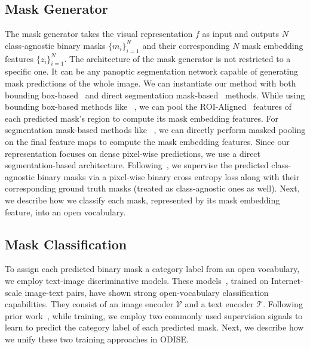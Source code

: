 \documentclass[10pt,twocolumn,letterpaper]{article}
\newcommand{\ourmethod}{ODISE}
\begin{document}
\subsection{Mask Generator}
\label{sec:mask-generator}
The mask generator takes the visual representation $f$ as input and outputs $N$ class-agnostic binary masks $\{m_i\}_{i=1}^N$ and their corresponding $N$ mask embedding features $\{z_i\}_{i=1}^N$.
The architecture of the mask generator is not restricted to a specific one. 
It can be any panoptic segmentation network capable of generating mask predictions of the whole image. 
We can instantiate our method with both bounding box-based~\cite{carion2020detr, kirillov2019panopticfpn} and direct segmentation mask-based~\cite{cheng2020panopticdeeplab, cheng2021maskformer, cheng2022mask2former, wang2021maxdeeplab} methods.
While using bounding box-based methods like ~\cite{carion2020detr, kirillov2019panopticfpn}, we can pool the ROI-Aligned~\cite{he2017maskrcnn} features of each predicted mask's region to compute its mask embedding features.
For segmentation mask-based methods like ~\cite{cheng2020panopticdeeplab, cheng2021maskformer, cheng2022mask2former, wang2021maxdeeplab}, we can directly perform masked pooling on the final feature maps to compute the mask embedding features. 
Since our representation focuses on dense pixel-wise predictions, we use a direct segmentation-based architecture. 
Following~\cite{he2017maskrcnn}, we supervise the predicted class-agnostic binary masks via a pixel-wise binary cross entropy loss along with their corresponding ground truth masks (treated as class-agnostic ones as well).
Next, we describe how we classify each mask, represented by its mask embedding feature, into an open vocabulary.  

\subsection{Mask Classification}
\label{sec:discriminative}

To assign each predicted binary mask a category label from an open vocabulary, we employ text-image discriminative models.
These models~\cite{radford2021clip, jia2021align, mu2021slip}, trained on Internet-scale image-text pairs, have shown strong open-vocabulary classification capabilities. 
They consist of an image encoder $\mathcal{V}$ and a text encoder $\mathcal{T}$. 
Following prior work~\cite{ghiasi2021open, li2022language}, while training, we employ two commonly used supervision signals to learn to predict the category label of each predicted mask. 
Next, we describe how we unify these two training approaches in \ourmethod{}. 
\end{document}
